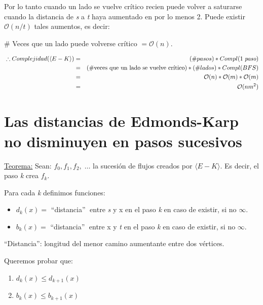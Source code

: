 \documentclass[12pt,a4paper]{report}
\begin{document}
		\vspace{5mm}
		Por lo tanto cuando un lado se vuelve crítico recien puede volver a saturarse cuando la distancia de \textit{s} a \textit{t} haya aumentado en por lo menos 2. Puede existir $\mathcal{O}(n/t)$ tales aumentos, es decir:

		\begin{center}
			\# Veces que un lado puede volverse crítico $= \mathcal{O}(n)$.
		\end{center}

		\begin{eqnarray}
			 \nonumber \; \therefore Complejidad(\langle E-K \rangle) &=& (\# pasos) * Compl(1 \; \textit{paso}) \\
			 \nonumber &=& (\# \textup{veces que un lado se vuelve crítico}) * (\# lados) * Compl(BFS) \\
			\nonumber  &=& \mathcal{O}(n) * \mathcal{O}(m)* \mathcal{O}(m) \\
			\nonumber &=& \mathcal{O}(nm^{2})
		\end{eqnarray}


	\section{Las distancias de Edmonds-Karp no disminuyen en pasos sucesivos}
		\underline{Teorema:} Sean: $f_{0}, f_{1}, f_{2}, \; \dotsc$ \;  la sucesión de flujos creados por $\langle E-K \rangle$. Es decir, el paso \textit{k} crea $f_{k}$.

		\vspace{5mm}
		Para cada \textit{k} definimos funciones:

		\begin{itemize}
			\item $d_{k}(x) =$ \textquotedblleft distancia\textquotedblright $\;$ entre \textit{s} y x en el paso \textit{k} en caso de existir, si no $\infty$.
			\item $b_{k}(x) =$ \textquotedblleft distancia\textquotedblright $\;$ entre x y \textit{t} en el paso \textit{k} en caso de existir, si no $\infty$.
		\end{itemize}

		\textquotedblleft Distancia\textquotedblright: longitud del menor camino aumentante entre dos vértices.

		\vspace{5mm}
		Queremos probar que:
		\begin{enumerate}
			\item $d_{k}(x) \leq d_{k+1}(x)$
			\item $b_{k}(x) \leq b_{k+1}(x)$
		\end{enumerate}
\end{document}
